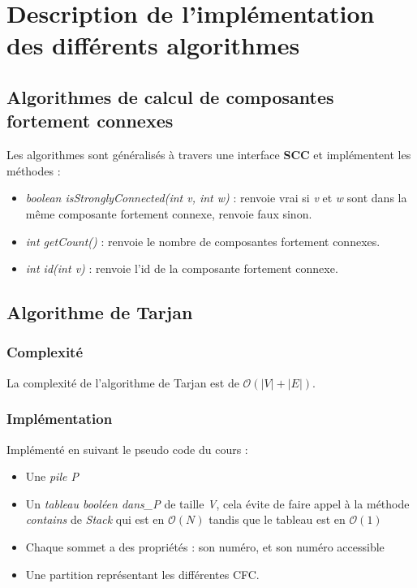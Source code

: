 \documentclass[11pt,a4paper]{article}
\begin{document}
\pagebreak
\section{Description de l'implémentation des différents algorithmes}

\subsection{Algorithmes de calcul de composantes fortement connexes}
Les algorithmes sont généralisés à travers une interface \textbf{SCC} et implémentent  les méthodes :
\begin{itemize}
\item \textit{boolean isStronglyConnected(int v, int w)} : renvoie vrai si \textit{v} et  \textit{w} sont dans la même composante fortement connexe, renvoie faux sinon.
\item \textit{int getCount()} : renvoie le nombre de composantes fortement connexes.
\item \textit{int id(int v)} : renvoie l'id de la composante fortement connexe.
\end{itemize}

\subsection{Algorithme de Tarjan}

\subsubsection{Complexité}
La complexité de l'algorithme de Tarjan est de $\mathcal{O}(|V|+|E|)$.

\subsubsection{Implémentation}
Implémenté en suivant le pseudo code du cours :
\begin{itemize}
\item Une \textit{pile P}
\item Un \textit{tableau booléen dans\_P} de taille \textit{V}, cela évite de faire appel à la méthode \textit{contains} de \textit{Stack} qui est en $\mathcal{O}(N)$ tandis que le tableau est en $\mathcal{O}(1)$
\item Chaque sommet a des propriétés : son numéro, et son numéro accessible
\item Une partition représentant les différentes CFC.
\end{itemize}
\end{document}

